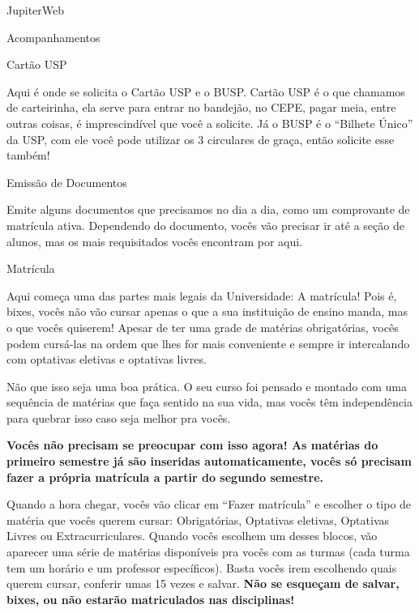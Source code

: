 \begin{secao}{JupiterWeb}
\begin{subsecao}{Acompanhamentos}
\begin{itemize}
\end{itemize}

\end{subsecao}

\begin{subsecao}{Cartão USP}

Aqui é onde se solicita o Cartão USP e o BUSP. Cartão USP é o que chamamos de
carteirinha, ela serve para entrar no bandejão, no CEPE, pagar meia, entre outras
coisas, é imprescindível que você a solicite. Já o BUSP é o ``Bilhete Único'' da USP,
com ele você pode utilizar os 3 circulares de graça, então solicite esse também!

\end{subsecao}

\begin{subsecao}{Emissão de Documentos}

Emite alguns documentos que precisamos no dia a dia, como um comprovante de
matrícula ativa. Dependendo do documento, vocês vão precisar ir até a seção de
alunos, mas os mais requisitados vocês encontram por aqui.

\end{subsecao}

\begin{subsecao}{Matrícula}

Aqui começa uma das partes mais legais da Universidade: A matrícula! Pois é,
bixes, vocês não vão cursar apenas o que a sua instituição de ensino manda, mas o
que vocês quiserem! Apesar de ter uma grade de matérias obrigatórias, vocês
podem cursá-las na ordem que lhes for mais conveniente e sempre ir intercalando
com optativas eletivas e optativas livres.

Não que isso seja uma boa prática. O seu curso foi pensado e montado com uma
sequência de matérias que faça sentido na sua vida, mas vocês têm independência
para quebrar isso caso seja melhor pra vocês.

\textbf{Vocês não precisam se preocupar com isso agora! As matérias do primeiro
semestre já são inseridas automaticamente, vocês só precisam fazer a própria
matrícula a partir do segundo semestre.}

Quando a hora chegar, vocês vão clicar em “Fazer matrícula” e escolher o tipo de
matéria que vocês querem cursar: Obrigatórias, Optativas eletivas, Optativas
Livres ou Extracurriculares. Quando vocês escolhem um desses blocos, vão
aparecer uma série de matérias disponíveis pra vocês com as turmas (cada turma
tem um horário e um professor específicos). Basta vocês irem escolhendo quais
querem cursar, conferir umas 15 vezes e salvar. \textbf{Não se esqueçam de salvar,
bixes, ou não estarão matriculados nas disciplinas!}


\end{subsecao}
\end{secao}
